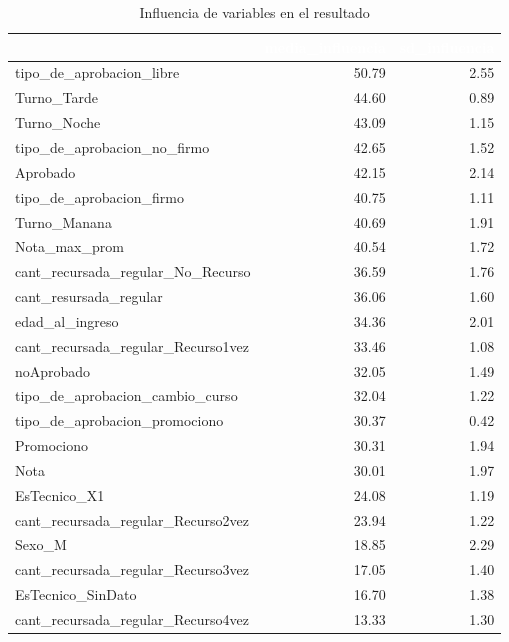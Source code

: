 \FloatBarrier

\begin{table}[!h]
	
	\caption{\label{tab:tf_rfe_influencia_variables_23}Influencia de variables en el resultado}
	\centering
	\begin{tabular}[t]{lrr}
		\toprule
		\rowcolor{black}  \multicolumn{1}{c}{\textcolor{white}{\textbf{var}}} & \multicolumn{1}{c}{\textcolor{white}{\textbf{media\_influencia}}} & \multicolumn{1}{c}{\textcolor{white}{\textbf{sd\_influencia}}}\\
		\midrule
		\rowcolor{gray!6}  tipo\_de\_aprobacion\_libre & 50.79 & 2.55\\
		Turno\_Tarde & 44.60 & 0.89\\
		\rowcolor{gray!6}  Turno\_Noche & 43.09 & 1.15\\
		tipo\_de\_aprobacion\_no\_firmo & 42.65 & 1.52\\
		\rowcolor{gray!6}  Aprobado & 42.15 & 2.14\\
		\addlinespace
		tipo\_de\_aprobacion\_firmo & 40.75 & 1.11\\
		\rowcolor{gray!6}  Turno\_Manana & 40.69 & 1.91\\
		Nota\_max\_prom & 40.54 & 1.72\\
		\rowcolor{gray!6}  cant\_recursada\_regular\_No\_Recurso & 36.59 & 1.76\\
		cant\_resursada\_regular & 36.06 & 1.60\\
		\addlinespace
		\rowcolor{gray!6}  edad\_al\_ingreso & 34.36 & 2.01\\
		cant\_recursada\_regular\_Recurso1vez & 33.46 & 1.08\\
		\rowcolor{gray!6}  noAprobado & 32.05 & 1.49\\
		tipo\_de\_aprobacion\_cambio\_curso & 32.04 & 1.22\\
		\rowcolor{gray!6}  tipo\_de\_aprobacion\_promociono & 30.37 & 0.42\\
		\addlinespace
		Promociono & 30.31 & 1.94\\
		\rowcolor{gray!6}  Nota & 30.01 & 1.97\\
		EsTecnico\_X1 & 24.08 & 1.19\\
		\rowcolor{gray!6}  cant\_recursada\_regular\_Recurso2vez & 23.94 & 1.22\\
		Sexo\_M & 18.85 & 2.29\\
		\addlinespace
		\rowcolor{gray!6}  cant\_recursada\_regular\_Recurso3vez & 17.05 & 1.40\\
		EsTecnico\_SinDato & 16.70 & 1.38\\
		\rowcolor{gray!6}  cant\_recursada\_regular\_Recurso4vez & 13.33 & 1.30\\
		\bottomrule
	\end{tabular}
\end{table}






